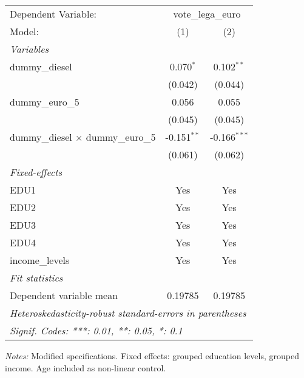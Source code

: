 
\begingroup
\centering
\begin{tabular}{lcc}
   \tabularnewline \midrule \midrule
   Dependent Variable: & \multicolumn{2}{c}{vote\_lega\_euro}\\
   Model:                                    & (1)           & (2)\\  
   \midrule
   \emph{Variables}\\
   dummy\_diesel                             & 0.070$^{*}$   & 0.102$^{**}$\\   
                                             & (0.042)       & (0.044)\\   
   dummy\_euro\_5                            & 0.056         & 0.055\\   
                                             & (0.045)       & (0.045)\\   
   dummy\_diesel $\times$ dummy\_euro\_5     & -0.151$^{**}$ & -0.166$^{***}$\\   
                                             & (0.061)       & (0.062)\\   
   \midrule
   \emph{Fixed-effects}\\
   EDU1                                      & Yes           & Yes\\  
   EDU2                                      & Yes           & Yes\\  
   EDU3                                      & Yes           & Yes\\  
   EDU4                                      & Yes           & Yes\\  
   income\_levels                            & Yes           & Yes\\  
   \midrule
   \emph{Fit statistics}\\
   Dependent variable mean                   & 0.19785       & 0.19785\\  
   \midrule \midrule
   \multicolumn{3}{l}{\emph{Heteroskedasticity-robust standard-errors in parentheses}}\\
   \multicolumn{3}{l}{\emph{Signif. Codes: ***: 0.01, **: 0.05, *: 0.1}}\\
\end{tabular}
 
\par \raggedright 
\textit{Notes:} Modified specifications. Fixed effects: grouped education levels, grouped income. Age included as non-linear control.
\par\endgroup


